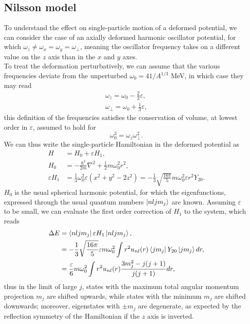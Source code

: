 \subsection{Nilsson model}
To understand the effect on single-particle motion of a deformed potential, we can consider the case of an axially deformed harmonic oscillator potential, for which $ \omega_z \neq \omega_x = \omega_y = \omega_\perp$, meaning the oscillator frequency takes on a different value on the $z$ axis than in the $x$ and $y$ axes.
\\To treat the deformation perturbatively, we can assume that the various frequencies deviate from the unperturbed $\omega_0=41/A^{1/3}$ MeV, in which case they may read
\begin{align}
\omega_z = \omega_0 - \frac 2 3 \varepsilon,\\
\omega_\perp = \omega_0 + \frac 1 3 \varepsilon,
\end{align}
this definition of the frequencies satisfies the conservation of volume, at lowest order in $\varepsilon$, assumed to hold for 
\begin{equation}
    \label{eq:volume_cons}
    \omega_0 ^ 3 = \omega_z \omega_\perp^2.
\end{equation}
We can thus write the single-particle Hamiltonian in the deformed potential as
\begin{align}
    H&=H_0 +\varepsilon H_1,\\
    H_0 &= -\frac{\hbar^2}{2m}\nabla^2 + \frac 1 2 m \omega_0^2 r^2,\\
    \varepsilon H_1 &= \frac 1 3 \omega_0 ^2 \varepsilon (x^2 + y^2 -2z^2) = -\frac 1 3 \sqrt{\frac{16\pi}{5}}m\omega_0^2\varepsilon r^2 Y_{20}.
\end{align}
$H_0$ is the usual spherical harmonic potential, for which the eigenfunctions, expressed through the usual quantum numbers $\ket{nljm_j}$ are known. Assuming $\varepsilon$ to be small, we can evaluate the first order correction of $H_1$ to the system, which reads
\begin{align}
\Delta E &= \bra{nljm_j}\varepsilon H_1 \ket{nljm_j},
\\&= -\frac 1 3 \sqrt{\frac{16 \pi}{5}}\varepsilon m \omega_0^2 \int r^2 u_{nl}(r)\bra{jm_j} Y_{20}\ket{jm_j} dr,
\\&= \frac \varepsilon 6 m\omega_0^2 \int r^2 u_{nl}(r)\frac{3m_j^2 - j(j+1)}{j(j+1)}dr,
\end{align}
thus in the limit of large $j$, states with the maximum total angular momentum projection $m_j$ are shifted upwards, while states with the minimum $m_j$ are shifted downwards; moreover, eigenstates with $\pm m_j$ are degenerate, as expected by the reflection symmetry of the Hamiltonian if the $z$ axis is inverted.
